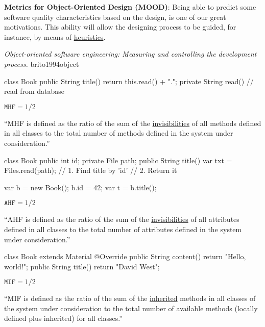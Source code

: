 \documentclass{article}
\begin{document}
  {\textbf{Metrics for Object-Oriented Design (MOOD)}: Being able to predict some software quality characteristics based on the design, is one of our great motivations. This ability will allow the designing process to be guided, for instance, by means of \ul{heuristics}.}{\textit{Object-oriented software engineering: Measuring and controlling the development process.}
  {brito1994object}

\begin{multicols}{2}
{\small\begin{ffcode}
class Book {
  public String title() {
    return this.read() + ".";
  }
  private String read() {
    // read from database
  }
}
\end{ffcode}
}
\par\columnbreak\par
\(\texttt{MHF} = 1/2\)\par
``MHF is defined as the ratio of the sum of the \ul{invisibilities} of all methods
defined in all classes to the total number of methods defined in the system
under consideration.''
\end{multicols}
\plush{}

\begin{multicols}{2}
{\small\begin{ffcode}
class Book {
  public int id;
  private File path;
  public String title() {
    var txt = Files.read(path);
    // 1. Find title by 'id'
    // 2. Return it
  }
}

var b = new Book();
b.id = 42;
var t = b.title();
\end{ffcode}
}
\par\columnbreak\par
\(\texttt{AHF} = 1/2\)\par
``AHF is defined as the ratio of the sum of the \ul{invisibilities} of all attributes
defined in all classes to the total number of attributes defined in the system
under consideration.''
\end{multicols}
\plush{}

\begin{multicols}{2}
{\small\begin{ffcode}
class Book extends Material {
  @Override
  public String content() {
    return "Hello, world!";
  }
  public String title() {
    return "David West";
  }
}
\end{ffcode}
}
\par\columnbreak\par
\(\texttt{MIF} = 1/2\)\par
``MIF is defined as the ratio of the sum of the \ul{inherited} methods in all classes of
the system under consideration to the total number of available methods
(locally defined plus inherited) for all classes.''
\end{multicols}
\plush{}

}
\end{document}
